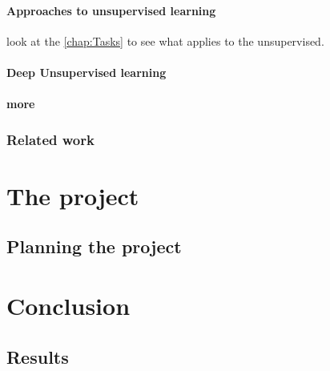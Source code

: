 \documentclass[a4paper,english]{ifimaster}
\begin{document}
\subsection{Approaches to unsupervised learning}
look at the \autoref{chap:Tasks} to see what applies to the unsupervised.

\subsection{Deep Unsupervised learning}
\subsection{more}
\section{Related work}


	      
		
		
		
		
		
		
		
		
		
		
		
		
		
		
		
		
		
		
		
		
		
		
		
		
		
\part{The project}

\chapter{Planning the project}

\part{Conclusion}

\chapter{Results}

\backmatter{}

\printbibliography
\end{document}

